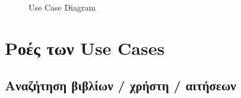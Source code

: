 \documentclass[12pt,a4paper]{article}
\begin{document}
\begin{figure}[H]
	\caption{Use Case Diagram}
	\label{Use Case Diagram}
\end{figure}


\section{Ροές των Use Cases}
\label{Ροές των Use Cases}

\subsection{Αναζήτηση βιβλίων / χρήστη / αιτήσεων}
\end{document}
